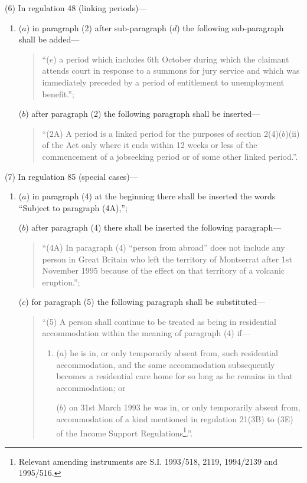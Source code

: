 \documentclass[12pt,a4paper]{article}
\begin{document}
(6) In regulation 48 (linking periods)—
\begin{enumerate}\item[]
($a$) in paragraph (2) after sub-paragraph ($d$) the following sub-paragraph shall be added—
\begin{quotation}
“($e$) a period which includes 6th October during which the claimant attends court in response to a summons for jury service and which was immediately preceded by a period of entitlement to unemployment benefit.”;
\end{quotation}

($b$) after paragraph (2) the following paragraph shall be inserted—
\begin{quotation}
“(2A) A period is a linked period for the purposes of section 2(4)($b$)(ii) of the Act only where it ends within 12 weeks or less of the commencement of a jobseeking period or of some other linked period.”.
\end{quotation}
\end{enumerate}

(7) In regulation 85 (special cases)—
\begin{enumerate}\item[]
($a$) in paragraph (4) at the beginning there shall be inserted the words “Subject to paragraph (4A),”;

($b$) after paragraph (4) there shall be inserted the following paragraph—
\begin{quotation}
“(4A) In paragraph (4) “person from abroad” does not include any person in Great Britain who left the territory of Montserrat after 1st November 1995 because of the effect on that territory of a volcanic eruption.”;
\end{quotation}

($c$) for paragraph (5) the following paragraph shall be substituted—
\begin{quotation}
“(5) A person shall continue to be treated as being in residential accommodation within the meaning of paragraph (4) if—
\begin{enumerate}\item[]
($a$) he is in, or only temporarily absent from, such residential accommodation, and the same accommodation subsequently becomes a residential care home for so long as he remains in that accommodation; or

($b$) on 31st March 1993 he was in, or only temporarily absent from, accommodation of a kind mentioned in regulation 21(3B) to (3E) of the Income Support Regulations\footnote{\frenchspacing Relevant amending instruments are S.I. 1993/518, 2119, 1994/2139 and 1995/516.}.”.
\end{enumerate}
\end{quotation}
\end{enumerate}
\end{document}
